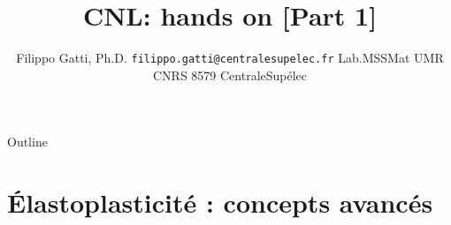 \documentclass[usenames,dvipsnames]{beamer}
\title[CentraleSupélec]{CNL: hands on [Part 1]}
\author[Filippo Gatti]{
	Filippo Gatti, Ph.D.
	\pdfnewline
	\texttt{filippo.gatti@centralesupelec.fr}
	\pdfnewline  Lab.MSSMat UMR CNRS 8579
	\pdfnewline CentraleSupélec
}
\institute{M2 Géo-mécanique : Ouvrages, Eau, Réservoirs (GEO2)}
\newcommand{\mainfolder}{/home/filippo/Data/Filippo}
\newcommand{\writeup}{\mainfolder/sokrates/MSROE/CNL/lecture-notes-2019}
\newcommand{\presentations}{\writeup}
\newcommand{\runfolder}{\presentations}
\newcommand{\runsections}{\runfolder/sections}
\begin{document}
	
	\begin{frame}
	\titlepage
\end{frame}

\begin{frame}{Outline}
\tableofcontents
\end{frame}

\section{Élastoplasticité : concepts avancés}




%
%
%
%
%
%
%
%
%
%
\end{document}
